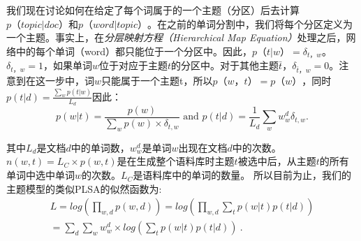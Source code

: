 我们现在讨论如何在给定了每个词属于的一个主题（分区）后去计算$ p（topic | doc）$和$ p（word | topic）$。在之前的单词分割中，我们将每个分区定义为一个主题。事实上，在\emph{分层映射方程（Hierarchical Map Equation）}处理之后，网络中的每个单词（word）都只能位于一个分区中。因此，$ p（t | w）= \delta_{t，w} $。 $ \delta_{t，w} = 1 $，如果单词$ w $位于对应于主题$ t $的分区中。对于其他主题$ \bar{t} $，$ \delta_{\bar{t}，w} = 0 $。注意到在这一步中，词$ w $只能属于一个主题t，所以$ p（w，t）= p（w）$，同时 $p(t|d) = \frac{\sum_wp(t|w)}{L_d}$因此：
   \begin{equation}
   p(w|t) = \frac{p(w)} {\sum_w p(w)\times \delta_{t,w}}  \mbox{    and    }  p(t|d) = \frac{1}{L_d} \sum_{w} w_w^d \delta_{t,w} .
  \end{equation}
  
其中$ L_d $是文档$ d $中的单词数，$ w_w^d $是单词$ w $出现在文档$ d $中的次数。$n(w,t) = L_C \times p(w,t)$是在生成整个语料库时主题$ t $被选中后，从主题$t$的所有单词中选中单词$w$的次数。$ L_C $是语料库中的单词的数量。
所以目前为止，我们的主题模型的类似PLSA的似然函数为:
 \begin{equation}
 \begin{split}
 L = log (\prod_{w,d}p(w,d)) = log (\prod_{w,d} \sum_{t}p(w|t)p(t|d))  \\= \sum_d \sum_w w_w^d \times log(\sum_{t}p(w|t)p(t|d)) \ .
 \end{split}
 \end{equation}
  
